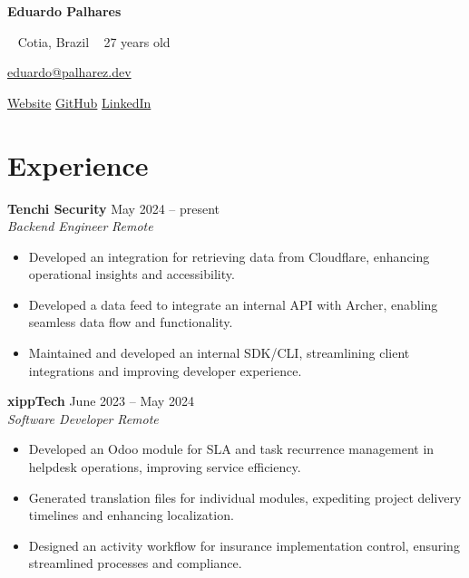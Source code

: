 \documentclass[a4paper,10pt]{article}
\newcommand{\entry}[4]{
  \noindent\textbf{#1} \hfill #2 \\
  \noindent\textit{#3} \hfill \textit{#4} \\
  \vspace{2pt}
}
\begin{document}

\noindent
\begin{minipage}[t]{0.5\textwidth}
\textbf{\Large Eduardo Palhares}

\vspace{0.4em}

\noindent \faMapMarker ~ Cotia, Brazil \faUser ~ 27 years old \\
\end{minipage}%
\begin{minipage}[t]{0.5\textwidth}
\raggedleft
{\color{blue}} \href{mailto:eduardo@palharez.dev}{\faEnvelope \space eduardo@palharez.dev}

\vspace{0.2em}

{\color{blue}} \href{https://palharez.dev/}{\faGlobe \space Website} \quad
{\color{blue}} \href{https://github.com/palharez}{\faGithub \space GitHub} \quad
{\color{blue}} \href{https://linkedin.com/in/eduardopalhares}{\faLinkedin \space LinkedIn} \\
\end{minipage}

\vspace{0.5em}

\section*{Experience}
\vspace{0.6em}
\entry{Tenchi Security}{\faCalendar \space May 2024 -- present}{Backend Engineer}{\faMapMarker \space Remote}
\vspace{-1.6em}
\begin{itemize}
\setlength\itemsep{-0.3em}
\item Developed an integration for retrieving data from Cloudflare, enhancing operational insights and accessibility.
\item Developed a data feed to integrate an internal API with Archer, enabling seamless data flow and functionality.
\item Maintained and developed an internal SDK/CLI, streamlining client integrations and improving developer experience.
\end{itemize}

\entry{xippTech}{\faCalendar \space June 2023 -- May 2024}{Software Developer}{\faMapMarker \space Remote}
\vspace{-1.6em}
\begin{itemize}
\setlength\itemsep{-0.3em}
\item Developed an Odoo module for SLA and task recurrence management in helpdesk operations, improving service efficiency.
\item Generated translation files for individual modules, expediting project delivery timelines and enhancing localization.
\item Designed an activity workflow for insurance implementation control, ensuring streamlined processes and compliance.
\end{itemize}
\end{document}
